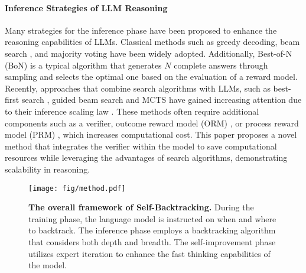 \paragraph{Inference Strategies of LLM Reasoning}
Many strategies for the inference phase have been proposed to enhance the reasoning capabilities of LLMs. Classical methods such as greedy decoding, beam search \citep{teller2000speech,graves2012sequence}, and majority voting \cite{wang2022selfconsistency} have been widely adopted. Additionally, Best-of-N (BoN) \cite{bonw} is a typical algorithm that generates $N$ complete answers through sampling and selects the optimal one based on the evaluation of a reward model. Recently, approaches that combine search algorithms with LLMs, such as best-first search \cite{tot}, guided beam search \cite{xie2024self} and MCTS \cite{choi2023kcts,feng2023alphazero,zhang2024rest,xie2024monte} have gained increasing attention due to their inference scaling law \cite{wu2024inference,snell2024scaling}. These methods often require additional components such as a verifier, outcome reward model (ORM) \cite{lightman2023let}, or process reward model (PRM) \cite{lightman2023let,wang2024math}, which increases computational cost. This paper proposes a novel method that integrates the verifier within the model to save computational resources while leveraging the advantages of search algorithms, demonstrating scalability in reasoning.

\begin{figure*}[t]
    \centering
    \texttt{[image: fig/method.pdf]}
    \caption{
        \textbf{The overall framework of Self-Backtracking.} During the training phase, the language model is instructed on when and where to backtrack. The inference phase employs a backtracking algorithm that considers both depth and breadth. The self-improvement phase utilizes expert iteration to enhance the fast thinking capabilities of the model.
        }
    \label{method}
\end{figure*}